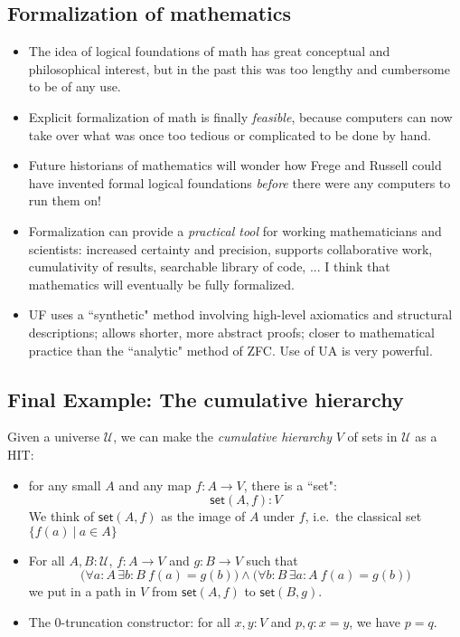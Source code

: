 \documentclass[11pt]{article}
\newcommand{\arr}{\ensuremath{\rightarrow}}
\newcommand{\U}{\mathcal{U}}
\begin{document}
\subsection*{Formalization of mathematics}

\begin{itemize}
\item The idea of logical foundations of math has great conceptual and philosophical interest, but in the past this was too lengthy and cumbersome to be of any use.

\item Explicit formalization of math is finally \emph{feasible}, because computers can now take over what was once too tedious or complicated to be done by hand.

\item Future historians of mathematics will wonder how Frege and Russell could have invented formal logical foundations \emph{before} there were any computers to run them on!

\item Formalization can provide a \emph{practical tool} for working mathematicians and scientists: increased certainty and precision, supports collaborative work, cumulativity of results, searchable library of code, ... I think that mathematics will  eventually be fully formalized.

\item UF uses a ``synthetic" method involving high-level axiomatics and structural descriptions; allows shorter, more abstract proofs; closer to mathematical practice than the ``analytic" method of ZFC.  Use of UA is very powerful.

\end{itemize}

\subsection*{Final Example: The cumulative hierarchy}

Given a universe $\U$, we can make the \emph{cumulative hierarchy} $V$ of sets  in $\U$ as a HIT:
\begin{itemize}
\item for any small  $A$ and any map $f : A\arr V$, there is a ``set":
\[
\mathsf{set}(A,f) : V
\]
We think of $\mathsf{set}(A,f)$ as the image of $A$ under $f$, i.e.\ the classical set $\{ f(a)\ |\ a \in A \}$

\item For all $A, B : \U$, $f : A \arr V$ and $g : B \arr V$ such that
    \[
      \big(\forall{a:A}\,\exists{b:B}\ f(a) = g(b)\big) \wedge \big(\forall{b:B}\,\exists{a:A}\ f(a)=g(b)\big)
    \]
    we put in a path in $V$ from $\mathsf{set}(A,f)$ to $\mathsf{set}(B,g)$.
  \item The $0$-truncation constructor: for all $x,y:V$ and $p,q:x=y$, we have $p=q$.
\end{itemize}
\end{document}
